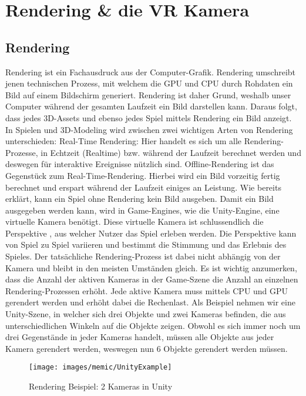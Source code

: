 \section{Rendering \& die VR Kamera}


\subsection{Rendering}

Rendering ist ein Fachausdruck aus der Computer-Grafik. Rendering umschreibt jenen technischen Prozess, mit welchem die GPU  und CPU durch Rohdaten ein Bild auf einem Bildschirm generiert. Rendering ist daher Grund, weshalb unser Computer während der gesamten Laufzeit ein Bild darstellen kann. Daraus folgt, dass jedes 3D-Assets und ebenso jedes Spiel mittels Rendering ein Bild anzeigt. In Spielen und 3D-Modeling wird zwischen zwei wichtigen Arten von Rendering unterschieden:
Real-Time Rendering: Hier handelt es sich um alle Rendering-Prozesse, in Echtzeit (Realtime) bzw. während der Laufzeit berechnet werden und deswegen für interaktive Ereignisse nützlich sind.
Offline-Rendering ist das Gegenstück zum Real-Time-Rendering. Hierbei wird ein Bild vorzeitig fertig berechnet und erspart während der Laufzeit einiges an Leistung.
Wie bereits erklärt, kann ein Spiel ohne Rendering kein Bild ausgeben. Damit ein Bild ausgegeben werden kann, wird in Game-Engines, wie die Unity-Engine, eine virtuelle Kamera benötigt. Diese virtuelle Kamera ist schlussendlich die Perspektive , aus welcher Nutzer das Spiel erleben werden. Die Perspektive kann von Spiel zu Spiel variieren und bestimmt die Stimmung und das Erlebnis des Spieles. Der tatsächliche Rendering-Prozess ist dabei nicht abhängig von der Kamera und bleibt in den meisten Umständen gleich.
Es ist wichtig anzumerken, dass die Anzahl der aktiven Kameras in der Game-Szene die Anzahl an einzelnen Rendering-Prozessen erhöht. Jede aktive Kamera muss mittels CPU und GPU gerendert werden und erhöht dabei die Rechenlast.
Als Beispiel nehmen wir eine Unity-Szene, in welcher sich drei Objekte und zwei Kameras befinden, die aus unterschiedlichen Winkeln auf die Objekte zeigen. Obwohl es sich immer noch um drei Gegenstände in jeder Kameras handelt, müssen alle Objekte aus jeder Kamera gerendert werden, weswegen nun 6 Objekte gerendert werden müssen.

\begin{figure}[H]
	\centering
	\texttt{[image: images/memic/UnityExample]}
	\caption{Rendering Beispiel: 2 Kameras in Unity}
\end{figure}

